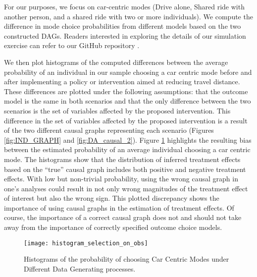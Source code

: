 For our purposes, we focus on car-centric modes (Drive alone, Shared ride with another person,
and a shared ride with two or more individuals).
We compute the difference in mode choice probabilities from different models based on the two constructed DAGs.
Readers interested in exploring the details of our simulation exercise can refer to our GitHub repository \citep{brathwaite_etal_2020}.



We then plot histograms of the computed differences between the average probability of an individual
in our sample choosing a car centric mode before and after implementing a policy or intervention
aimed at reducing travel distance.
These differences are plotted under the following assumptions: that the outcome model is the same in both scenarios and that the only difference between the two scenarios is the set of variables affected by the proposed intervention.
This difference in the set of variables affected by the proposed intervention is a result of the two different causal graphs representing each scenario (Figures \ref{fig:IND_GRAPH} and \ref{fig:DA_causal_2}).
Figure \ref{fig:histogram_probability} highlights the resulting bias between the estimated probability of an average individual choosing a car centric mode.
The histograms show that the distribution of inferred treatment effects based on the ``true'' causal graph includes both positive and negative treatment effects.
With low but non-trivial probability, using the wrong causal graph in one's analyses could result in not only wrong magnitudes of the treatment effect of interest but also the wrong sign.
This plotted discrepancy shows the importance of using causal graphs in the estimation of treatment effects.
Of course, the importance of a correct causal graph does not and should not take away from the importance of correctly specified outcome choice models.

\begin{figure}[h!]
   \centering
   \texttt{[image: histogram\_selection\_on\_obs]}
   \caption{Histograms of the probability of choosing Car Centric Modes under Different Data Generating processes.}
   \label{fig:histogram_probability}
\end{figure}

